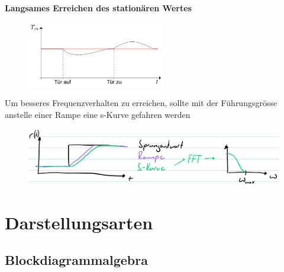 \documentclass[
  10pt,
  a4paper,
  twocolumn]{article}
\numberwithin{equation}{section}
\begin{document}
\textbf{Langsames Erreichen des stationären Wertes}

\begin{figure}[H]

{\centering \includegraphics[width=6cm,height=\textheight]{images/storverhalten/slow.png}

}

\end{figure}

\begin{tcolorbox}[enhanced jigsaw, opacitybacktitle=0.6, bottomrule=.15mm, left=2mm, colframe=quarto-callout-tip-color-frame, titlerule=0mm, toprule=.15mm, bottomtitle=1mm, toptitle=1mm, coltitle=black, title=\textcolor{quarto-callout-tip-color}{\faLightbulb}\hspace{0.5em}{Besseres Frequenzverhalten}, arc=.35mm, rightrule=.15mm, colback=white, opacityback=0, leftrule=.75mm, colbacktitle=quarto-callout-tip-color!10!white, breakable]

Um besseres Frequenzverhalten zu erreichen, sollte mit der
Führungsgrösse anstelle einer Rampe eine s-Kurve gefahren werden

\begin{figure}[H]

{\centering \includegraphics{images/paste-67.png}

}

\end{figure}

\end{tcolorbox}

\hypertarget{darstellungsarten}{%
\section{Darstellungsarten}\label{darstellungsarten}}

\hypertarget{blockdiagrammalgebra}{%
\subsection{Blockdiagrammalgebra}\label{blockdiagrammalgebra}}
\end{document}
